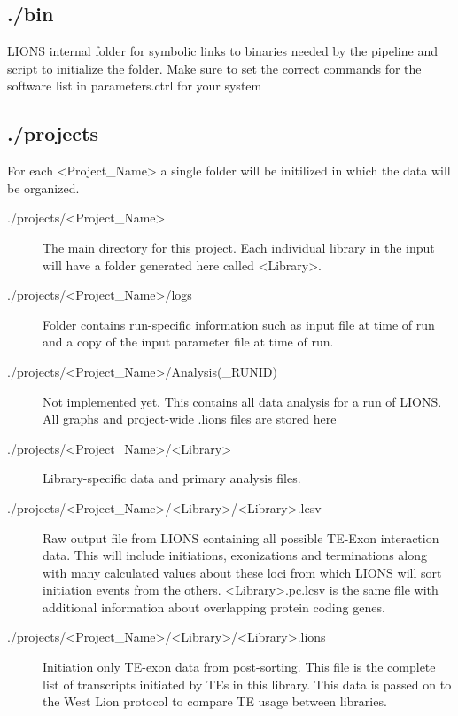 \documentclass[11pt]{scrartcl}
\newcommand{\arrows}[1]{\textless #1\textgreater}
\begin{document}
\subsection{./bin}
  LIONS internal folder for symbolic links to binaries needed by
  the pipeline and script to initialize the folder. Make sure to set
  the correct commands for the software list in parameters.ctrl for
  your system


\subsection{./projects}
  For each \arrows{Project\_Name} a single folder will be initilized in which
  the data will be organized.

\begin{description}
\item[./projects/\arrows{Project\_Name}]
  The main directory for this project. Each individual library in the
  input will have a folder generated here called \arrows{Library}.

\item[./projects/\arrows{Project\_Name}/logs]
  Folder contains run-specific information such as input file at time
  of run and a copy of the input parameter file at time of run.

\item[./projects/\arrows{Project\_Name}/Analysis(\_RUNID)]
  Not implemented yet. This contains all data analysis for a run
  of LIONS. All graphs and project-wide .lions files are stored here
  
\item[./projects/\arrows{Project\_Name}/\arrows{Library}]
  Library-specific data and primary analysis files.

\item[./projects/\arrows{Project\_Name}/\arrows{Library}/\arrows{Library}.lcsv]
  Raw output file from LIONS containing all possible TE-Exon interaction
  data. This will include initiations, exonizations and terminations
  along with many calculated values about these loci from which
  LIONS will sort initiation events from the others. \arrows{Library}.pc.lcsv
  is the same file with additional information about overlapping protein
  coding genes.

\item[./projects/\arrows{Project\_Name}/\arrows{Library}/\arrows{Library}.lions]
  Initiation only TE-exon data from post-sorting. This file is the 
  complete list of transcripts initiated by TEs in this library. This
  data is passed on to the West Lion protocol to compare TE usage
  between libraries.


\end{description}
\end{document}
